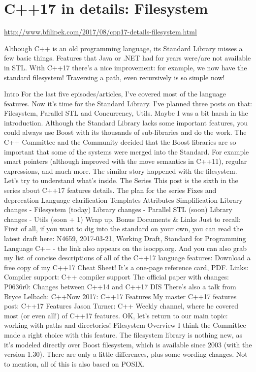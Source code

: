 \section{C++17 in details: Filesystem}
\url{http://www.bfilipek.com/2017/08/cpp17-details-filesystem.html}

Although C++ is an old programming language, its Standard Library misses a few basic things. Features that Java or .NET had for years were/are not available in STL. With C++17 there’s a nice improvement: for example, we now have the standard filesystem! 
Traversing a path, even recursively is so simple now!

Intro
For the last five episodes/articles, I’ve covered most of the language features. Now it’s time for the Standard Library. I’ve planned three posts on that: Filesystem, Parallel STL and Concurrency, Utils.
Maybe I was a bit harsh in the introduction. Although the Standard Library lacks some important features, you could always use Boost with its thousands of sub-libraries and do the work. The C++ Committee and the Community decided that the Boost libraries are so important that some of the systems were merged into the Standard. For example smart pointers (although improved with the move semantics in C++11), regular expressions, and much more.
The similar story happened with the filesystem. Let’s try to understand what’s inside.
The Series
This post is the sixth in the series about C++17 features details.
The plan for the series
Fixes and deprecation
Language clarification
Templates
Attributes
Simplification
Library changes - Filesystem (today)
Library changes - Parallel STL (soon)
Library changes - Utils (soon + 1)
Wrap up, Bonus
Documents & Links
Just to recall:
First of all, if you want to dig into the standard on your own, you can read the latest draft here: 
N4659, 2017-03-21, Working Draft, Standard for Programming Language C++ - the link also appears on the isocpp.org.
And you can also grab my list of concise descriptions of all of the C++17 language features:
Download a free copy of my C++17 Cheat Sheet! 
It’s a one-page reference card, PDF.
Links:
Compiler support: C++ compiler support
The official paper with changes: P0636r0: Changes between C++14 and C++17 DIS
There’s also a talk from Bryce Lelbach: C++Now 2017: C++17 Features
My master C++17 features post: C++17 Features
Jason Turner: C++ Weekly channel, where he covered most (or even all!) of C++17 features.
OK, let’s return to our main topic: working with paths and directories!
Filesystem Overview
I think the Committee made a right choice with this feature. The filesystem library is nothing new, as it’s modeled directly over Boost filesystem, which is available since 2003 (with the version 1.30). There are only a little differences, plus some wording changes. Not to mention, all of this is also based on POSIX.
